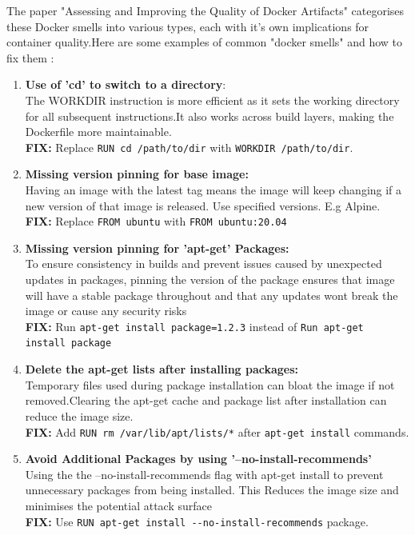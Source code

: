 The paper "Assessing and Improving the Quality of Docker Artifacts" \cite{DockerArtifacts} categorises these Docker smells into various types, each with it's own implications for container quality.Here are some examples of common "docker smells" and how to fix them \cite{DockerSmellEmpherical}:
\begin{enumerate}
    \item \textbf{Use of 'cd' to switch to a directory}:
    \\The WORKDIR instruction is more efficient as it sets the working directory for all subsequent instructions.It also works across build layers, making the Dockerfile more maintainable. 
    \\\textbf{FIX:} Replace \verb|RUN cd /path/to/dir| with \verb|WORKDIR /path/to/dir|. 

    \item \textbf{Missing version pinning for base image:}
    \\Having an image with the latest tag means the image will keep changing if a new version of that image is released. 
    Use specified versions. E.g Alpine. 
    \\\textbf{FIX:} Replace \verb|FROM ubuntu| with \verb|FROM ubuntu:20.04|

    \item \textbf{Missing version pinning for 'apt-get' Packages:}
    \\To ensure consistency in builds and prevent issues caused by unexpected updates in packages, pinning the version of the package ensures that image will have a stable package throughout and that any updates wont break the image or cause any security risks 
    \\\textbf{FIX:} Run \verb|apt-get install package=1.2.3| instead of \verb|Run apt-get install package|
    
    \item \textbf{Delete the apt-get lists after installing packages:}
    \\Temporary files used during package installation can bloat the image if not removed.Clearing the apt-get cache and package list after installation can reduce the image size. 
    \\\textbf{FIX:} Add \verb|RUN rm /var/lib/apt/lists/*| after \verb|apt-get install| commands.
    
    \item \textbf{Avoid Additional Packages by using '--no-install-recommends'}
    \\Using the the --no-install-recommends flag with apt-get install to prevent unnecessary packages from being installed. This Reduces the image size and minimises the potential attack surface
    \\\textbf{FIX:} Use \verb|RUN apt-get install --no-install-recommends| package. 
    

\end{enumerate}
